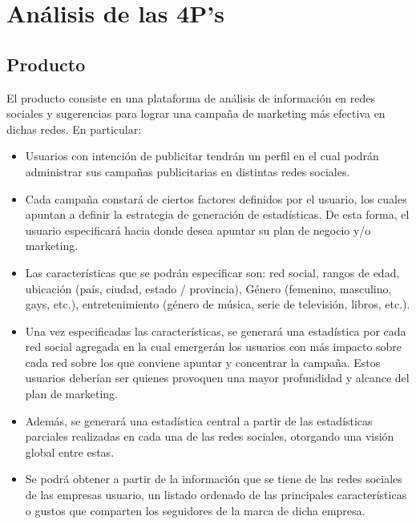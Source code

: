 \documentclass[oneside]{book}
\begin{document}
\newpage



\section{An\'{a}lisis de las 4P's}

\subsection{Producto}
El producto consiste en una plataforma de an\'{a}lisis de informaci\'{o}n en redes sociales y sugerencias para lograr una campa\~{n}a de marketing m\'{a}s efectiva en dichas redes.
En particular:

\begin{itemize}
\item Usuarios con intenci\'{o}n de publicitar tendr\'{a}n un perfil en el cual podr\'{a}n administrar sus campañas publicitarias en distintas redes sociales.

\item Cada campa\~{n}a constar\'{a} de ciertos factores definidos por el usuario, los cuales apuntan a definir la estrategia de generaci\'{o}n de estad\'{i}sticas. De esta forma, el usuario especificar\'{a} hacia donde desea apuntar su plan de negocio y/o marketing.

\item Las caracter\'{i}sticas que se podrán especificar son: red social, rangos de edad, ubicación (pa\'{i}s, ciudad, estado / provincia), Género (femenino, masculino, gays, etc.), entretenimiento (g\'{e}nero de música, serie de televisi\'{o}n, libros, etc.).

\item Una vez especificadas las caracter\'{i}sticas, se generar\'{a} una estad\'{i}stica por cada red social agregada en la cual emerger\'{a}n los usuarios con m\'{a}s impacto sobre cada red sobre los que conviene apuntar y concentrar la campa\~{n}a. Estos usuarios deber\'{i}an ser quienes provoquen una mayor profundidad y alcance del plan de marketing. 

\item Adem\'{a}s, se generará una estad\'{i}stica central a partir de las estad\'{i}sticas parciales realizadas en cada una de las redes sociales, otorgando una visi\'{o}n global entre estas.

\item Se podr\'{a} obtener a partir de la informaci\'{o}n que se tiene de las redes sociales de las empresas usuario, un listado ordenado de las principales caracter\'{i}sticas o gustos que comparten los seguidores de la marca de dicha empresa.


\end{itemize}
\end{document}
